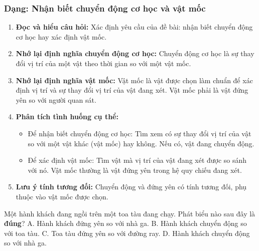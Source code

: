 \subsubsection{Dạng: Nhận biết chuyển động cơ học và vật mốc}
\begin{phuongphap}
\begin{enumerate}
    \item \textbf{Đọc và hiểu câu hỏi:} Xác định yêu cầu của đề bài: nhận biết chuyển động cơ học hay xác định vật mốc.
    \item \textbf{Nhớ lại định nghĩa chuyển động cơ học:} Chuyển động cơ học là sự thay đổi vị trí của một vật theo thời gian so với một vật mốc.
    \item \textbf{Nhớ lại định nghĩa vật mốc:} Vật mốc là vật được chọn làm chuẩn để xác định vị trí và sự thay đổi vị trí của vật đang xét. Vật mốc phải là vật đứng yên so với người quan sát.
    \item \textbf{Phân tích tình huống cụ thể:}
    \begin{itemize}
        \item Để nhận biết chuyển động cơ học: Tìm xem có sự thay đổi vị trí của vật so với một vật khác (vật mốc) hay không. Nếu có, vật đang chuyển động.
        \item Để xác định vật mốc: Tìm vật mà vị trí của vật đang xét được so sánh với nó. Vật mốc thường là vật đứng yên trong hệ quy chiếu đang xét.
    \end{itemize}
    \item \textbf{Lưu ý tính tương đối:} Chuyển động và đứng yên có tính tương đối, phụ thuộc vào vật mốc được chọn.
\end{enumerate}
\end{phuongphap}
\begin{vidumau}
Một hành khách đang ngồi trên một toa tàu đang chạy. Phát biểu nào sau đây là \textbf{đúng}?
\choice
{A. Hành khách đứng yên so với nhà ga.}
{B. Hành khách chuyển động so với toa tàu.}
{C. Toa tàu đứng yên so với đường ray.}
{\True D. Hành khách chuyển động so với nhà ga.}
\end{vidumau}

